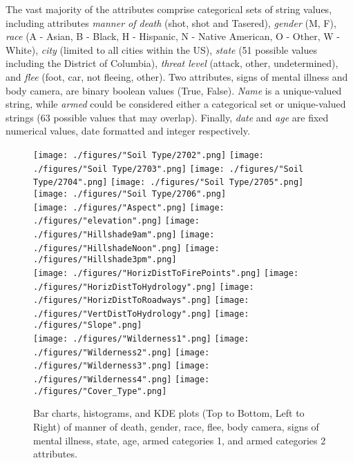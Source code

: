 \documentclass[10pt, conference, compsocconf]{IEEEtran}
\begin{document}
The vast majority of the attributes comprise categorical sets of string values, including attributes \textit{manner of death} (shot, shot and Tasered), \textit{gender} (M, F), \textit{race} (A - Asian, B - Black, H - Hispanic, N - Native American, O - Other, W - White), \textit {city} (limited to all cities within the US), \textit{state} (51 possible values including the District of Columbia), \textit{threat level} (attack, other, undetermined), and \textit{flee} (foot, car, not fleeing, other). Two attributes, signs of mental illness and body camera, are binary boolean values (True, False). \textit{Name} is a unique-valued string, while \textit{armed} could be considered either a categorical set or unique-valued strings (63 possible values that may overlap). Finally, \textit{date} and \textit{age} are fixed numerical values, date formatted and integer respectively. 

\begin{figure*}[ht]
	\vspace{-2mm}
	\centering
	\texttt{[image: ./figures/"Soil Type/2702".png]}
	\texttt{[image: ./figures/"Soil Type/2703".png]}
	\texttt{[image: ./figures/"Soil Type/2704".png]}
	\texttt{[image: ./figures/"Soil Type/2705".png]}
	\texttt{[image: ./figures/"Soil Type/2706".png]}\\
	
	\centering	
	\texttt{[image: ./figures/"Aspect".png]}
	\texttt{[image: ./figures/"elevation".png]}
	\texttt{[image: ./figures/"Hillshade9am".png]}
	\texttt{[image: ./figures/"HillshadeNoon".png]}
	\texttt{[image: ./figures/"Hillshade3pm".png]}\\
	
	\centering
	\texttt{[image: ./figures/"HorizDistToFirePoints".png]}
	\texttt{[image: ./figures/"HorizDistToHydrology".png]}
	\texttt{[image: ./figures/"HorizDistToRoadways".png]}
	\texttt{[image: ./figures/"VertDistToHydrology".png]}
	\texttt{[image: ./figures/"Slope".png]}\\
	
		\centering
	\texttt{[image: ./figures/"Wilderness1".png]}
	\texttt{[image: ./figures/"Wilderness2".png]}
	\texttt{[image: ./figures/"Wilderness3".png]}
	\texttt{[image: ./figures/"Wilderness4".png]}
	\texttt{[image: ./figures/"Cover\_Type".png]}\\
	
	\caption{Bar charts, histograms, and KDE plots (Top to Bottom, Left to Right) of manner of death, gender, race, flee, body camera, signs of mental illness, state, age, armed categories 1, and armed categories 2 attributes.}
	\label{fig1}
\end{figure*}
\end{document}
